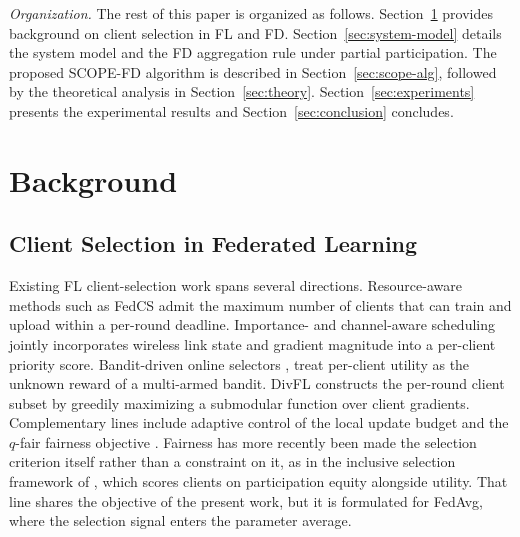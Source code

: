 \documentclass[journal]{IEEEtran}
\newcommand{\rev}[1]{{\color{blue}#1}}
\begin{document}

\textit{Organization.} The rest of this paper is organized as follows. Section~\ref{sec:related-work} provides background on client selection in FL and FD. Section~\ref{sec:system-model} details the system model and the FD aggregation rule under partial participation. The proposed SCOPE-FD algorithm is described in Section~\ref{sec:scope-alg}, followed by the theoretical analysis in Section~\ref{sec:theory}. Section~\ref{sec:experiments} presents the experimental results and Section~\ref{sec:conclusion} concludes.

\section{Background}
\label{sec:related-work}

\subsection{Client Selection in Federated Learning}
\label{ssec:rw-fl-selection}

Existing FL client-selection work spans several directions. Resource-aware methods such as FedCS \cite{nishio2019client} admit the maximum number of clients that can train and upload within a per-round deadline. Importance- and channel-aware scheduling \cite{yang2020scheduling, ren2020scheduling, shi2020joint} jointly incorporates wireless link state and gradient magnitude into a per-client priority score. Bandit-driven online selectors \cite{xia2020mab}, \cite{cho2020bandit} treat per-client utility as the unknown reward of a multi-armed bandit. DivFL \cite{balakrishnan2022divfl} constructs the per-round client subset by greedily maximizing a submodular function over client gradients. Complementary lines include adaptive control of the local update budget \cite{wang2019adaptive} and the $q$-fair fairness objective \cite{li2020qffl}. \rev{Fairness has more recently been made the selection criterion itself rather than a constraint on it, as in the inclusive selection framework of \cite{arisdakessian2026vox}, which scores clients on participation equity alongside utility. That line shares the objective of the present work, but it is formulated for FedAvg, where the selection signal enters the parameter average.}
\end{document}
